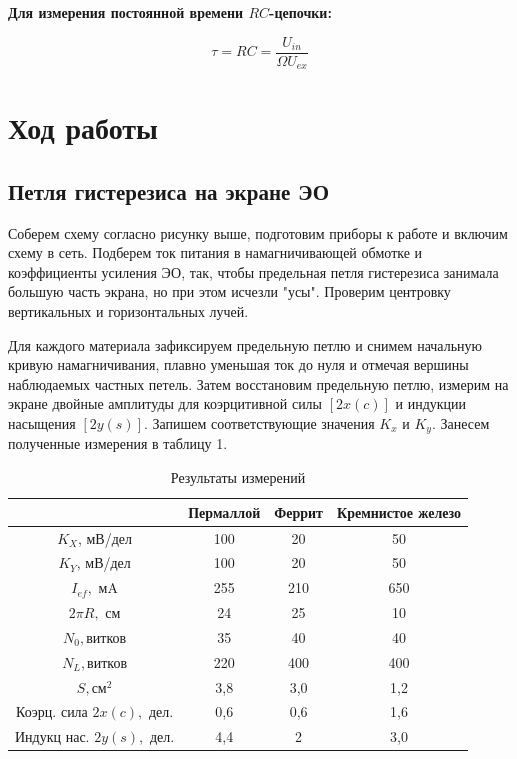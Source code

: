 \documentclass[a4paper,12pt]{article}
\begin{document}
\textbf{Для измерения постоянной времени $RC$-цепочки:}

\begin{equation}\label{}
    \tau=RC=\frac{U_{in}}{\Omega U_{ex}}
\end{equation}


\bigskip


\section{Ход работы}

\subsection{Петля гистерезиса на экране ЭО}


Соберем схему согласно рисунку выше, подготовим приборы к работе и включим схему в сеть. Подберем ток питания в намагничивающей обмотке и коэффициенты усиления ЭО, так, чтобы предельная петля гистерезиса занимала большую часть экрана, но при этом исчезли "усы". Проверим центровку вертикальных и горизонтальных лучей.

Для каждого материала зафиксируем предельную петлю и снимем начальную кривую намагничивания, плавно уменьшая ток до нуля и отмечая вершины наблюдаемых частных петель. Затем восстановим предельную петлю, измерим на экране двойные амплитуды для коэрцитивной силы $[2x(c)]$ и индукции насыщения $[2y(s)]$. Запишем соответствующие значения $K_x$ и $K_y$. Занесем полученные измерения в таблицу 1.

\begin{table}[h!]
	\centering
	\caption{Результаты измерений}
    \begin{tabular}{|c|c|c|c|}
	\hline 
	 & Пермаллой & Феррит & Кремнистое железо \\ 
	 \hline 
	$K_X$, мВ/дел & 100 & 20 & 50 \\
    \hline
	$K_Y$, мВ/дел & 100 & 20 & 50 \\ 
	\hline
	$I_{ef},$ мA & 255 & 210 & 650 \\ 
	\hline
	$2\pi R,$ см & 24 & 25 & 10 \\ 
	\hline
	$N_0,$витков & 35 & 40 & 40 \\ 
	\hline
	$N_L,$витков & 220 & 400 & 400 \\ 
	\hline
	$S,{см}^2$ & 3,8 & 3,0 & 1,2 \\ 
	\hline
	Коэрц. сила $2x(c),$ дел. & 0,6 & 0,6 & 1,6 \\ 
	\hline
	Индукц нас. $2y(s),$ дел. & 4,4 & 2 & 3,0 \\	
	\hline
	\end{tabular}%
\label{resT}%
\end{table}%
\end{document}
